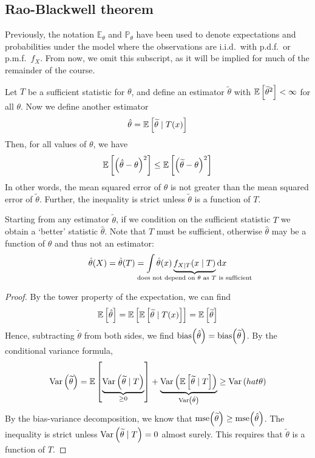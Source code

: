 \subsection{Rao-Blackwell theorem}
Previously, the notation \( \mathbb E_\theta \) and \( \mathbb P_\theta \) have been used to denote expectations and probabilities under the model where the observations are i.i.d.\ with p.d.f.\ or p.m.f.\ \( f_X \).
From now, we omit this subscript, as it will be implied for much of the remainder of the course.
\begin{theorem}
	Let \( T \) be a sufficient statistic for \( \theta \), and define an estimator \( \widetilde \theta \) with \( \mathbb{E}\left[{{\widetilde \theta}^2}\right] < \infty \) for all \( \theta \).
	Now we define another estimator
	\[
		\hat \theta = \mathbb{E}\left[{\widetilde \theta \mid T(x)}\right]
	\]
	Then, for all values of \( \theta \), we have
	\[
		\mathbb{E}\left[{\qty(\hat \theta - \theta)^2}\right] \leq \mathbb{E}\left[{\qty(\widetilde \theta - \theta)^2}\right]
	\]
	In other words, the mean squared error of \( \hat \theta \) is not greater than the mean squared error of \( \widetilde \theta \).
	Further, the inequality is strict unless \( \widetilde \theta \) is a function of \( T \).
\end{theorem}
\begin{remark}
	Starting from any estimator \( \widetilde \theta \), if we condition on the sufficient statistic \( T \) we obtain a `better' statistic \( \hat \theta \).
	Note that \( T \) must be sufficient, otherwise \( \hat \theta \) may be a function of \( \theta \) and thus not an estimator:
	\[
		\hat \theta(X) = \hat \theta(T) = \int \hat \theta(x) \underbrace{f_{X \mid T}(x \mid T)}_{\mathclap{\text{does not depend on } \theta \text{ as } T \text{ is sufficient}}} \dd{x}
	\]
\end{remark}
\begin{proof}
	By the tower property of the expectation, we can find
	\[
		\mathbb{E}\left[{\hat \theta}\right] = \mathbb{E}\left[{\mathbb{E}\left[{\widetilde \theta \mid T(x)}\right]}\right] = \mathbb{E}\left[{\widetilde \theta}\right]
	\]
	Hence, subtracting \( \widetilde \theta \) from both sides, we find \( \mathrm{bias}\qty(\hat\theta) = \mathrm{bias}\qty(\widetilde\theta) \).
	By the conditional variance formula,
	\[
		\operatorname{Var}\left({\widetilde \theta}\right) = \mathbb{E}\left[{\underbrace{\operatorname{Var}\left({\widetilde \theta \mid T}\right)}_{\geq 0}}\right] + \underbrace{\operatorname{Var}\left({\mathbb{E}\left[{\widetilde \theta \mid T}\right]}\right)}_{\operatorname{Var}\left({\hat\theta}\right)} \geq \operatorname{Var}\left({hat \theta}\right)
	\]
	By the bias-variance decomposition, we know that \( \mathrm{mse}\qty(\widetilde \theta) \geq \mathrm{mse}\qty(\hat \theta) \).
	The inequality is strict unless \( \operatorname{Var}\left({\widetilde \theta \mid T}\right) = 0 \) almost surely.
	This requires that \( \widetilde \theta \) is a function of \( T \).
\end{proof}

